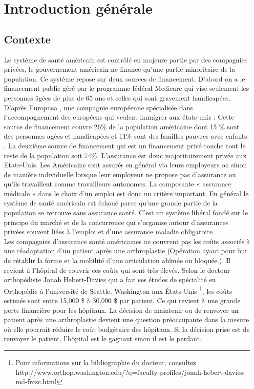 \documentclass[12pt, french]{report}
\begin{document}
\newpage
\chapter{Introduction générale}	
\section{Contexte}
Le système de santé américain est contrôlé en majeure partie par des compagnies privées, le gouvernement américain ne finance qu'une partie minoritaire de la population. Ce système  repose sur deux sources de financement. D'abord on a le financement public géré par le programme fédéral Medicare qui vise seulement les personnes âgées de plus de 65 ans et celles qui sont gravement handicapées. D'après Europusa \cite{key4}, une compagnie européenne spécialisée dans l'accompagnement des européens qui veulent immigrer aux états-unis : \guillemotleft Cette source de financement couvre 26\% de la population américaine dont 15 \% sont des personnes agées et handicapées et 11\% sont des familles pauvres avec enfants.  \guillemotright. La deuxième source de financement qui est un financement privé touche tout le reste de la population soit 74\%. L’assurance est donc majoritairement privée aux Etats-Unis. Les Américains sont assurés en général via leurs employeurs ou sinon de manière individuelle lorsque leur employeur ne propose pas d’assurance ou qu’ils travaillent comme travailleurs autonomes. La composante « 	assurance médicale » dans le choix d’un emploi est donc un critère important. En général le système de santé américain est échoué parce qu'une grande partie de la population se retrouve sans assurance santé. C'est un système libéral fondé sur le principe du marché et de la concurrence qui s’organise autour d’assurances privées souvent liées à l’emploi et d’une assurance maladie obligatoire. \\

Les compagnies d'assurance santé américaines ne couvrent pas les coûts associés à une réadaptation d'un patient après une arthroplastie (Opération ayant pour but de rétablir la forme et la mobilité d'une articulation abîmée ou bloquée.). Il revient à l'hôpital de couvrir ces coûts qui sont très élevés. Selon le docteur orthopédiste Jonah Hebert-Davies qui a fait ses études de spécialité en Orthopédie à l'université de Seattle, Washington aux États-Unis \footnote{Pour informations sur la bibliographie du docteur, consultez http://www.orthop.washington.edu/?q=faculty-profiles/jonah-hebert-davies-md-frcsc.html}, les coûts estimés sont entre 15,000 \$ à 30,000 \$ par patient. Ce qui revient à une grande perte financière pour les hôpitaux.  La décision de maintenir ou de renvoyer un patient après une arthroplastie devient une question préoccupante dans la mesure où elle pourrait réduire le coût budgétaire des hôpitaux. Si la décision prise est de renvoyer le patient, l'hôpital est le gagnant sinon il est le perdant. \\ 
\end{document}
